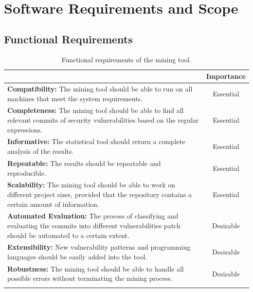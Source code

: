\documentclass[12pt, a4paper]{report}
\begin{document}
\section{Software Requirements and Scope} \label{sec:software_req}
\subsection{Functional Requirements}
\begin{longtable}{|p{10.3cm}|c|}
  \hline \endfirsthead \rowcolor[HTML]{D8D8D8}
  \multicolumn{1}{|c|}{Criteria} & Importance \\ \hline
  \textbf{Compatibility:} The mining tool should be able to run on all machines that meet the
  system requirements. & Essential \\ \hline
  \textbf{Completeness:} The mining tool should be able to find all relevant commits of security
  vulnerabilities based on the regular expressions. & Essential \\ \hline
  \textbf{Informative:} The statistical tool should return a complete analysis of the results. &
  Essential \\ \hline
  \textbf{Repeatable:} The results should be repeatable and reproducible. & Essential \\ \hline
  \textbf{Scalability:} The mining tool should be able to work on different project sizes, provided
  that the repository contains a certain amount of information. & Essential \\ \hline
  \textbf{Automated Evaluation:} The process of classifying and evaluating the commits into
  different vulnerabilities patch should be automated to a certain extent. & Desirable \\ \hline
  \textbf{Extensibility:} New vulnerability patterns and programming languages should be easily
  added into the tool. & Desirable \\ \hline
  \textbf{Robustness:} The mining tool should be able to handle all possible errors without
  terminating the mining process. & Desirable \\ \hline
  \caption{Functional requirements of the mining tool.} \label{table:func_req}
\end{longtable}
\end{document}
